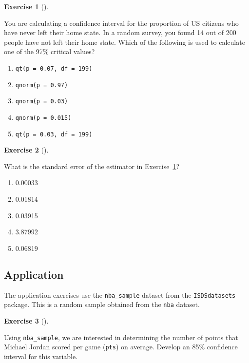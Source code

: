 \documentclass[
  letterpaper,
  DIV=11,
  numbers=noendperiod]{scrreprt}
\providecommand{\tightlist}{%
  \setlength{\itemsep}{0pt}\setlength{\parskip}{0pt}}\usepackage{longtable,booktabs,array}
\theoremstyle{definition}
\newtheorem{exercise}{Exercise}[chapter]
\theoremstyle{remark}
\begin{document}
\begin{exercise}[]\protect\hypertarget{exr-ch10-c08}{}\label{exr-ch10-c08}

You are calculating a confidence interval for the proportion of US
citizens who have never left their home state. In a random survey, you
found 14 out of 200 people have not left their home state. Which of the
following is used to calculate one of the 97\% critical values?

\begin{enumerate}
\def\labelenumi{\alph{enumi})}
\tightlist
\item
  \texttt{qt(p\ =\ 0.07,\ df\ =\ 199)}
\item
  \texttt{qnorm(p\ =\ 0.97)}
\item
  \texttt{qnorm(p\ =\ 0.03)}
\item
  \texttt{qnorm(p\ =\ 0.015)}
\item
  \texttt{qt(p\ =\ 0.03,\ df\ =\ 199)}
\end{enumerate}

\end{exercise}

\begin{exercise}[]\protect\hypertarget{exr-ch10-c09}{}\label{exr-ch10-c09}

What is the standard error of the estimator in
Exercise~\ref{exr-ch10-c08}?

\begin{enumerate}
\def\labelenumi{\alph{enumi})}
\tightlist
\item
  0.00033
\item
  0.01814
\item
  0.03915
\item
  3.87992
\item
  0.06819
\end{enumerate}

\end{exercise}

\hypertarget{sec-ex10-application}{%
\subsection{Application}\label{sec-ex10-application}}

The application exercises use the \texttt{nba\_sample} dataset from the
\texttt{ISDSdatasets} package. This is a random sample obtained from the
\texttt{nba} dataset.

\begin{exercise}[]\protect\hypertarget{exr-ch10-app1}{}\label{exr-ch10-app1}

Using \texttt{nba\_sample}, we are interested in determining the number
of points that Michael Jordan scored per game (\texttt{pts}) on average.
Develop an 85\% confidence interval for this variable.

\end{exercise}
\end{document}
